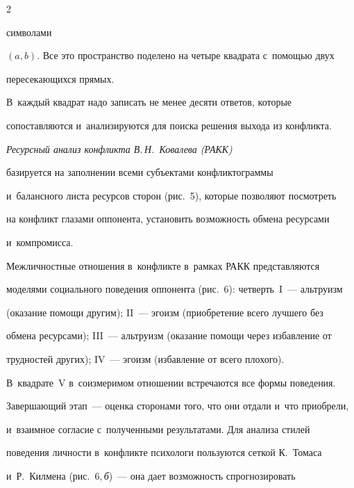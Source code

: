 \begin{multicols}{2}



\noindent

 символами 

$(a, b)$. Все это пространство поделено на четыре квад\-ра\-та с~по\-мощью двух 

пе\-ре\-се\-ка\-ющих\-ся прямых.

     В~каж\-дый квадрат надо записать не менее десяти ответов, которые 

со\-по\-став\-ля\-ют\-ся и~анализируются для поиска решения выхода из кон\-фликта. 

{



}

  

  \textit{Ресурсный анализ конфликта В.\,Н.~Ковалева (РАКК)}~\cite{22-r} 

базируется на заполнении всеми субъектами конфликтограммы 

и~балансного листа ресурсов сторон (рис.~5), которые позволяют по\-смот\-реть 

на конфликт глазами оппонента, установить воз\-мож\-ность обмена ресурсами 

и~компромисса.

  





  Межличностные отношения в~конфликте в~рамках РАКК представляются 

моделями социального поведения оппонента (рис.~6): четверть~I~--- альтруизм 

(оказание помощи другим); II~--- эгоизм (приобретение всего лучшего без 

обмена ресурсами); III~--- альтруизм (оказание помощи через избавление от 

трудностей других); IV~--- эгоизм (избавление от всего плохого). 

В~квадрате~V в~соизмеримом отношении встречаются все формы поведения. 

Завершающий этап~--- оценка сторонами того, что они отдали и~что приобрели, 

и~взаимное согласие с~полученными результатами. Для анализа стилей 

поведения личности в~конфликте психологи пользуются сеткой К.~Томаса 

и~Р.~Килмена (рис.~6,\,\textit{б})~--- она дает возможность спрогнозировать 


\end{multicols}
